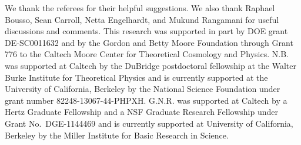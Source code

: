 \documentclass[12pt,english]{article}
\begin{document}
We thank the referees for their helpful suggestions. We also thank Raphael Bousso, Sean Carroll, Netta Engelhardt, and Mukund Rangamani for useful discussions and comments. This research was supported in part by DOE grant DE-SC0011632 and by the Gordon and Betty Moore Foundation through Grant 776 to the Caltech Moore Center for Theoretical Cosmology and Physics. N.B. was supported at Caltech by the DuBridge postdoctoral fellowship at the Walter Burke Institute for Theoretical Physics and is currently supported at the University of California, Berkeley by the National Science Foundation under grant number 82248-13067-44-PHPXH. G.N.R. was supported at Caltech by a Hertz Graduate Fellowship and a NSF Graduate Research Fellowship under Grant No.~DGE-1144469 and is currently supported at University of California, Berkeley by the Miller Institute for Basic Research in Science.



\end{document}
